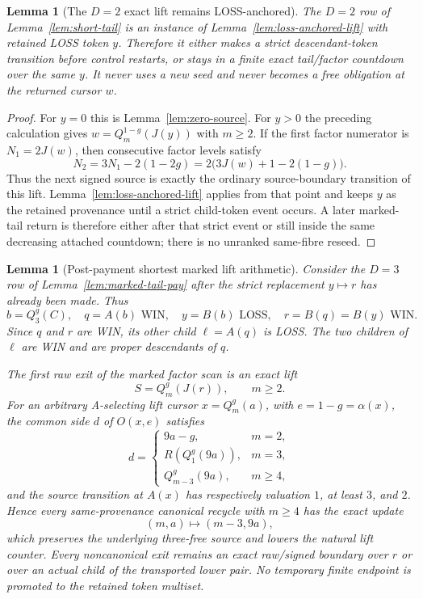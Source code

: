 \documentclass[11pt]{article}
\newtheorem{lemma}[theorem]{Lemma}
\begin{document}
\begin{lemma}[The $D=2$ exact lift remains LOSS-anchored]
\label{lem:D2-pure}
The $D=2$ row of Lemma~\ref{lem:short-tail} is an instance of
Lemma~\ref{lem:loss-anchored-lift} with retained LOSS token $y$.  Therefore
it either makes a strict descendant-token transition before control restarts,
or stays in a finite exact tail/factor countdown over the same $y$.  It never
uses a new seed and never becomes a free obligation at the returned cursor
$w$.
\end{lemma}

\begin{proof}
For $y=0$ this is Lemma~\ref{lem:zero-source}.  For $y>0$ the preceding
calculation gives $w=Q_m^{1-g}(J(y))$ with $m\ge2$.  If the first factor
numerator is $N_1=2J(w)$, then consecutive factor levels satisfy
\[
 N_2=3N_1-2(1-2g)
    =2\bigl(3J(w)+1-2(1-g)\bigr).
\]
Thus the next signed source is exactly the ordinary source-boundary
transition of this lift.  Lemma~\ref{lem:loss-anchored-lift} applies from
that point and keeps $y$ as the retained provenance until a strict
child-token event occurs.  A later marked-tail return is therefore either
after that strict event or still inside the same decreasing attached
countdown; there is no unranked same-fibre reseed.
\end{proof}

\begin{lemma}[Post-payment shortest marked lift arithmetic]
\label{lem:attached-lift}
Consider the $D=3$ row of Lemma~\ref{lem:marked-tail-pay} after the strict
replacement $y\mapsto r$ has already been made. Thus
\[
 b=Q_3^g(C),\quad q=A(b)\text{ WIN},\quad y=B(b)\text{ LOSS},\quad
 r=B(q)=B(y)\text{ WIN}.
\]
Since $q$ and $r$ are WIN, its other child $\ell=A(q)$ is LOSS. The two
children of $\ell$ are WIN and are proper descendants of $q$.

The first raw exit of the marked factor scan is an exact lift
\[
 S=Q_m^g(J(r)),\qquad m\ge2.
\]
For an arbitrary A-selecting lift cursor $x=Q_m^g(a)$, with
$e=1-g=\alpha(x)$, the common side $d$ of $O(x,e)$ satisfies
\[
 d=\begin{cases}
 9a-g,&m=2,\\
 R(Q_1^g(9a)),&m=3,\\
 Q_{m-3}^g(9a),&m\ge4,
 \end{cases}
\]
and the source transition at $A(x)$ has respectively valuation $1$, at least
$3$, and $2$. Hence every same-provenance canonical recycle with $m\ge4$
has the exact update
\[
 (m,a)\longmapsto(m-3,9a),
\]
which preserves the underlying three-free source and lowers the natural lift
counter. Every noncanonical exit remains an exact raw/signed boundary over
$r$ or over an actual child of the transported lower pair. No temporary
finite endpoint is promoted to the retained token multiset.
\end{lemma}
\end{document}
